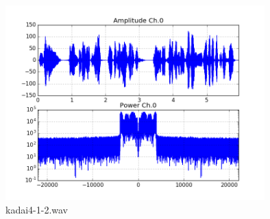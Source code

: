 \begin{figure}[ht]
  \begin{center}
    \includegraphics[width=10cm]{./img/kadai4-1-2.png}
    \caption{kadai4-1-2.wav}
  \end{center}
\end{figure}



